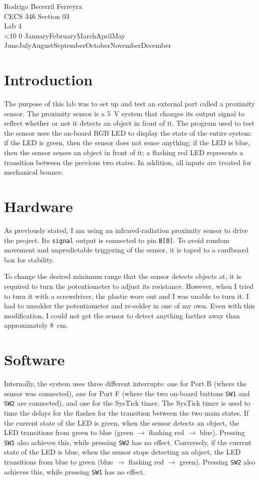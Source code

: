 \documentclass{article}
\renewcommand{\c}[1]{\texttt{#1}}
\renewcommand{\today}{\ifnum\number\day<10 0\fi \number\day \space%
\ifcase \month \or January\or February\or March\or April\or May%
\or June\or July\or August\or September\or October\or November\or December\fi\space%
\number \year}
\begin{document}
\noindent
Rodrigo Becerril Ferreyra\\
CECS 346 Section 03\\
Lab 4\\
\today

\section{Introduction}
The purpose of this lab was to set up and test an external
part called a proximity sensor. The proximity sensor is a
\SI{5}{\volt} system that changes its output signal to reflect
whether or not it detects an object in front of it. The
program used to test the sensor uses the on-board RGB LED
to display the state of the entire system: if the LED is green,
then the sensor does not sense anything; if the LED is blue,
then the sensor senses an object in front of it; a flashing
red LED represents a transition between the previous two states.
In addition, all inputs are treated for mechanical bounce.

\section{Hardware}
As previously stated, I am using an
infrared-radiation proximity sensor to drive the project.
Its \c{signal} output is connected to pin \c{B[0]}. To avoid
random movement and unpredictable triggering of the sensor,
it is taped to a cardboard box for stability.

To change the desired minimum range that the sensor detects
objects at, it is required to turn the potentiometer to
adjust its resistance. However, when I tried to turn it with a
screwdriver, the plastic wore out and I was unable to turn it.
I had to unsolder the potentiometer and re-solder in one of my
own. Even with this modification, I could not get the sensor
to detect anything farther away than approximately \SI{8}{cm}.

\section{Software}
Internally, the system uses three different interrupts:
one for Port B (where the sensor was connected), one for
Port F (where the two on-board buttons \c{SW1} and \c{SW2}
are connected), and one for the SysTick timer. The SysTick
timer is used to time the delays for the flashes for the
transition between the two main states. If the current state
of the LED is green, when the sensor detects
an object, the LED transitions from green to blue (green
$\rightarrow$ flashing red $\rightarrow$ blue). Pressing
\c{SW1} also achieves this, while pressing \c{SW2} has no effect.
Conversely,
if the current state
of the LED is blue, when the sensor stops detecting
an object, the LED transitions from blue to green (blue
$\rightarrow$ flashing red $\rightarrow$ green). Pressing
\c{SW2} also achieves this, while pressing \c{SW1} has no effect.
\end{document}
